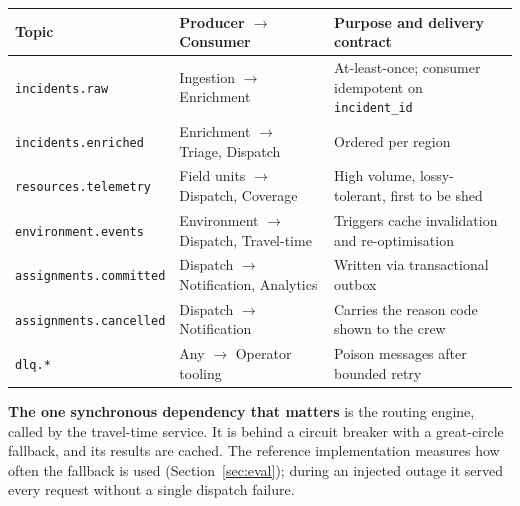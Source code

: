 \documentclass[11pt,a4paper]{article}
\begin{document}
\begin{center}\footnotesize
\begin{tabular}{@{}llp{62mm}@{}}
\toprule
\textbf{Topic} & \textbf{Producer $\rightarrow$ Consumer} & \textbf{Purpose and delivery contract} \\
\midrule
\texttt{incidents.raw} & Ingestion $\rightarrow$ Enrichment & At-least-once; consumer idempotent on \texttt{incident\_id} \\
\texttt{incidents.enriched} & Enrichment $\rightarrow$ Triage, Dispatch & Ordered per region \\
\texttt{resources.telemetry} & Field units $\rightarrow$ Dispatch, Coverage & High volume, lossy-tolerant, first to be shed \\
\texttt{environment.events} & Environment $\rightarrow$ Dispatch, Travel-time & Triggers cache invalidation and re-optimisation \\
\texttt{assignments.committed} & Dispatch $\rightarrow$ Notification, Analytics & Written via transactional outbox \\
\texttt{assignments.cancelled} & Dispatch $\rightarrow$ Notification & Carries the reason code shown to the crew \\
\texttt{dlq.*} & Any $\rightarrow$ Operator tooling & Poison messages after bounded retry \\
\bottomrule
\end{tabular}
\end{center}

\begin{keybox}
\textbf{The one synchronous dependency that matters} is the routing engine,
called by the travel-time service. It is behind a circuit breaker with a
great-circle fallback, and its results are cached. The reference
implementation measures how often the fallback is used
(Section~\ref{sec:eval}); during an injected outage it served every request
without a single dispatch failure.
\end{keybox}
\end{document}
